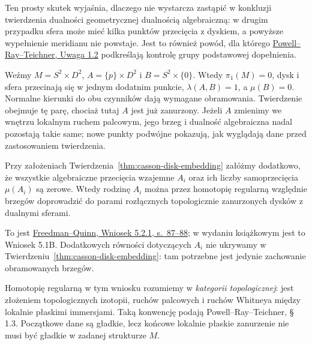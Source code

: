 Ten prosty skutek wyjaśnia, dlaczego nie wystarcza
zastąpić w konkluzji twierdzenia dualności
geometrycznej dualnością algebraiczną: w drugim
przypadku sfera może mieć kilka punktów przecięcia
z dyskiem, a powyższe wypełnienie meridianu nie
powstaje. Jest to również powód, dla którego
\href{https://arxiv.org/pdf/2006.05209}
{Powell--Ray--Teichner, Uwaga 1.2} podkreślają
kontrolę grupy podstawowej dopełnienia.

\begin{przyklad}
\label{prz:casson-dual-product}
Weźmy $M=S^2\times D^2$,
$A=\{p\}\times D^2$ i $B=S^2\times\{0\}$.
Wtedy $\pi_1(M)=0$, dysk i sfera przecinają się
w jednym dodatnim punkcie, $\lambda(A,B)=1$,
a $\mu(B)=0$. Normalne kierunki do obu czynników
dają wymagane obramowania. Twierdzenie obejmuje
tę parę, chociaż tutaj $A$ jest już zanurzony.
Jeżeli $A$ zmienimy we wnętrzu lokalnym ruchem
palcowym, jego brzeg i dualność
algebraiczna nadal pozostają takie same;
nowe punkty podwójne pokazują, jak wyglądają
dane przed zastosowaniem twierdzenia.
\end{przyklad}

\begin{wniosek}
\label{cor:casson-regular-homotopy}
Przy założeniach Twierdzenia~\ref{thm:casson-disk-embedding}
załóżmy dodatkowo, że wszystkie algebraiczne
przecięcia wzajemne $A_i$ oraz ich liczby
samoprzecięcia $\mu(A_i)$ są zerowe.
Wtedy rodzinę $A_i$ można przez homotopię
regularną względnie brzegów doprowadzić do
parami rozłącznych topologicznie zanurzonych
dysków z dualnymi sferami.
\end{wniosek}

To jest \href{https://archive.mpim-bonn.mpg.de/4789/2/FreedmanQuinn-TopologyOf4Manifolds-Reformatted2013.pdf}
{Freedman--Quinn, Wniosek 5.2.1, s.\ 87--88};
w wydaniu książkowym jest to Wniosek 5.1B.
Dodatkowych równości dotyczących $A_i$ nie
ukrywamy w Twierdzeniu~\ref{thm:casson-disk-embedding}:
tam potrzebne jest jedynie zachowanie
obramowanych brzegów.

Homotopię regularną w tym wniosku rozumiemy
w \emph{kategorii topologicznej}: jest złożeniem
topologicznych izotopii, ruchów palcowych i ruchów Whitneya
między lokalnie płaskimi immersjami. Taką konwencję
podają Powell--Ray--Teichner, \S\,1.3.
Początkowe dane są gładkie, lecz końcowe lokalnie płaskie
zanurzenie nie musi być gładkie w zadanej strukturze $M$.


